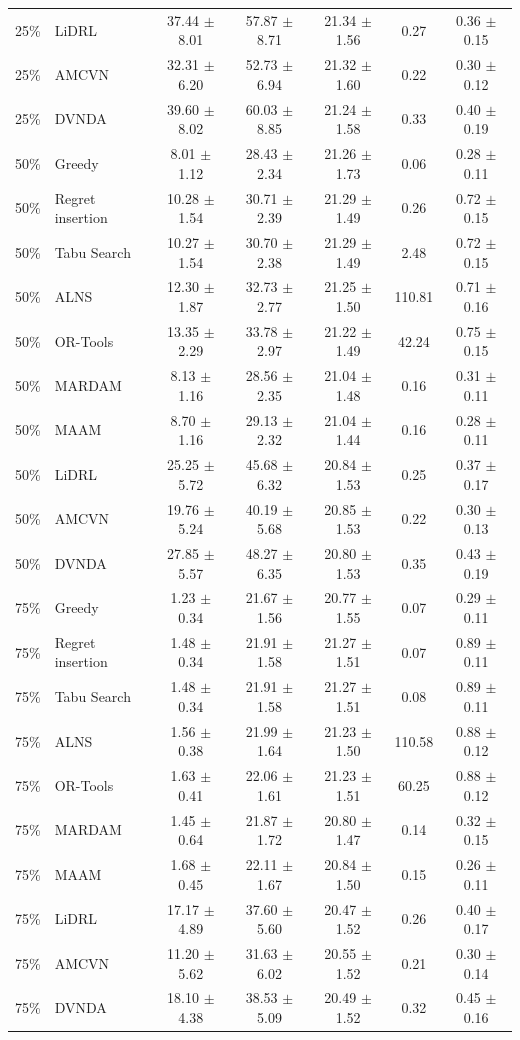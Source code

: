 \begin{tabular}{clccccc}
25\% & LiDRL & 37.44 $\pm$ 8.01 & 57.87 $\pm$ 8.71 & 21.34 $\pm$ 1.56 & 0.27 & 0.36 $\pm$ 0.15 \\
25\% & AMCVN & 32.31 $\pm$ 6.20 & 52.73 $\pm$ 6.94 & 21.32 $\pm$ 1.60 & 0.22 & 0.30 $\pm$ 0.12 \\
25\% & DVNDA & 39.60 $\pm$ 8.02 & 60.03 $\pm$ 8.85 & 21.24 $\pm$ 1.58 & 0.33 & 0.40 $\pm$ 0.19 \\
50\% & Greedy & 8.01 $\pm$ 1.12 & 28.43 $\pm$ 2.34 & 21.26 $\pm$ 1.73 & 0.06 & 0.28 $\pm$ 0.11 \\
50\% & Regret insertion & 10.28 $\pm$ 1.54 & 30.71 $\pm$ 2.39 & 21.29 $\pm$ 1.49 & 0.26 & 0.72 $\pm$ 0.15 \\
50\% & Tabu Search & 10.27 $\pm$ 1.54 & 30.70 $\pm$ 2.38 & 21.29 $\pm$ 1.49 & 2.48 & 0.72 $\pm$ 0.15 \\
50\% & ALNS & 12.30 $\pm$ 1.87 & 32.73 $\pm$ 2.77 & 21.25 $\pm$ 1.50 & 110.81 & 0.71 $\pm$ 0.16 \\
50\% & OR-Tools & 13.35 $\pm$ 2.29 & 33.78 $\pm$ 2.97 & 21.22 $\pm$ 1.49 & 42.24 & 0.75 $\pm$ 0.15 \\
50\% & MARDAM & 8.13 $\pm$ 1.16 & 28.56 $\pm$ 2.35 & 21.04 $\pm$ 1.48 & 0.16 & 0.31 $\pm$ 0.11 \\
50\% & MAAM & 8.70 $\pm$ 1.16 & 29.13 $\pm$ 2.32 & 21.04 $\pm$ 1.44 & 0.16 & 0.28 $\pm$ 0.11 \\
50\% & LiDRL & 25.25 $\pm$ 5.72 & 45.68 $\pm$ 6.32 & 20.84 $\pm$ 1.53 & 0.25 & 0.37 $\pm$ 0.17 \\
50\% & AMCVN & 19.76 $\pm$ 5.24 & 40.19 $\pm$ 5.68 & 20.85 $\pm$ 1.53 & 0.22 & 0.30 $\pm$ 0.13 \\
50\% & DVNDA & 27.85 $\pm$ 5.57 & 48.27 $\pm$ 6.35 & 20.80 $\pm$ 1.53 & 0.35 & 0.43 $\pm$ 0.19 \\
75\% & Greedy & 1.23 $\pm$ 0.34 & 21.67 $\pm$ 1.56 & 20.77 $\pm$ 1.55 & 0.07 & 0.29 $\pm$ 0.11 \\
75\% & Regret insertion & 1.48 $\pm$ 0.34 & 21.91 $\pm$ 1.58 & 21.27 $\pm$ 1.51 & 0.07 & 0.89 $\pm$ 0.11 \\
75\% & Tabu Search & 1.48 $\pm$ 0.34 & 21.91 $\pm$ 1.58 & 21.27 $\pm$ 1.51 & 0.08 & 0.89 $\pm$ 0.11 \\
75\% & ALNS & 1.56 $\pm$ 0.38 & 21.99 $\pm$ 1.64 & 21.23 $\pm$ 1.50 & 110.58 & 0.88 $\pm$ 0.12 \\
75\% & OR-Tools & 1.63 $\pm$ 0.41 & 22.06 $\pm$ 1.61 & 21.23 $\pm$ 1.51 & 60.25 & 0.88 $\pm$ 0.12 \\
75\% & MARDAM & 1.45 $\pm$ 0.64 & 21.87 $\pm$ 1.72 & 20.80 $\pm$ 1.47 & 0.14 & 0.32 $\pm$ 0.15 \\
75\% & MAAM & 1.68 $\pm$ 0.45 & 22.11 $\pm$ 1.67 & 20.84 $\pm$ 1.50 & 0.15 & 0.26 $\pm$ 0.11 \\
75\% & LiDRL & 17.17 $\pm$ 4.89 & 37.60 $\pm$ 5.60 & 20.47 $\pm$ 1.52 & 0.26 & 0.40 $\pm$ 0.17 \\
75\% & AMCVN & 11.20 $\pm$ 5.62 & 31.63 $\pm$ 6.02 & 20.55 $\pm$ 1.52 & 0.21 & 0.30 $\pm$ 0.14 \\
75\% & DVNDA & 18.10 $\pm$ 4.38 & 38.53 $\pm$ 5.09 & 20.49 $\pm$ 1.52 & 0.32 & 0.45 $\pm$ 0.16 \\
\bottomrule
\end{tabular}
